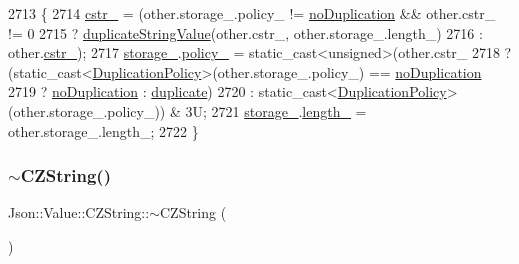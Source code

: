 \begin{DoxyCode}
2713                                              \{
2714   \hyperlink{class_json_1_1_value_1_1_c_z_string_a5b4d28349294034d7f779c3c95d0306c}{cstr\_} = (other.storage\_.policy\_ != \hyperlink{class_json_1_1_value_1_1_c_z_string_a2805c46fb4a72bbaed55de6d75941b6da08d540450fa6c4af57eaacf063eedd20}{noDuplication} && other.cstr\_ != 0
2715                  ? \hyperlink{namespace_json_a678ac3a60cd70ec0fb4c9abfd40eb0c4}{duplicateStringValue}(other.cstr\_, other.storage\_.length\_)
2716                  : other.\hyperlink{class_json_1_1_value_1_1_c_z_string_a5b4d28349294034d7f779c3c95d0306c}{cstr\_});
2717   \hyperlink{class_json_1_1_value_1_1_c_z_string_a17c92f0f089a4314e3b1d5695dc1a851}{storage\_}.\hyperlink{struct_json_1_1_value_1_1_c_z_string_1_1_string_storage_a7f68c8d6197c5692a525854b5f29f87b}{policy\_} = \textcolor{keyword}{static\_cast<}\textcolor{keywordtype}{unsigned}\textcolor{keyword}{>}(other.cstr\_
2718                  ? (\textcolor{keyword}{static\_cast<}\hyperlink{class_json_1_1_value_1_1_c_z_string_a2805c46fb4a72bbaed55de6d75941b6d}{DuplicationPolicy}\textcolor{keyword}{>}(other.storage\_.policy\_) == 
      \hyperlink{class_json_1_1_value_1_1_c_z_string_a2805c46fb4a72bbaed55de6d75941b6da08d540450fa6c4af57eaacf063eedd20}{noDuplication}
2719                      ? \hyperlink{class_json_1_1_value_1_1_c_z_string_a2805c46fb4a72bbaed55de6d75941b6da08d540450fa6c4af57eaacf063eedd20}{noDuplication} : \hyperlink{class_json_1_1_value_1_1_c_z_string_a2805c46fb4a72bbaed55de6d75941b6dabb2134294dd8fc37dd82d18bb794fe20}{duplicate})
2720                  : \textcolor{keyword}{static\_cast<}\hyperlink{class_json_1_1_value_1_1_c_z_string_a2805c46fb4a72bbaed55de6d75941b6d}{DuplicationPolicy}\textcolor{keyword}{>}(other.storage\_.policy\_)) & 3U;
2721   \hyperlink{class_json_1_1_value_1_1_c_z_string_a17c92f0f089a4314e3b1d5695dc1a851}{storage\_}.\hyperlink{struct_json_1_1_value_1_1_c_z_string_1_1_string_storage_a165d865c44e6471d34668eeb4f15b140}{length\_} = other.storage\_.length\_;
2722 \}
\end{DoxyCode}
\mbox{\label{class_json_1_1_value_1_1_c_z_string_add6989dc7073646b95e5ebacb3f07d51}} 
\subsubsection{\texorpdfstring{$\sim$\+C\+Z\+String()}{~CZString()}}
{\footnotesize\ttfamily Json\+::\+Value\+::\+C\+Z\+String\+::$\sim$\+C\+Z\+String (\begin{DoxyParamCaption}{ }\end{DoxyParamCaption})}



